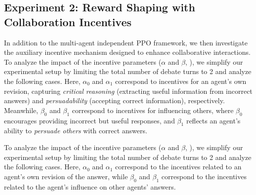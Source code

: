 \safevspace{-4mm}
\subsection{Experiment 2: Reward Shaping with Collaboration Incentives}
\label{sec:exp2}
In addition to the multi-agent independent PPO framework, we then investigate the auxiliary incentive mechanism designed to enhance collaborative interactions. 
To analyze the impact of the incentive parameters (\(\alpha\) and \(\beta\), ), we simplify our experimental setup by limiting the total number of debate turns to 2 and analyze the following cases. Here, \(\alpha_0\) and \(\alpha_1\) correspond to incentives for an agent’s own revision, capturing \textit{critical reasoning} (extracting useful information from incorrect answers) and \textit{persuadability} (accepting correct information), respectively. Meanwhile, \(\beta_0\) and \(\beta_1\) correspond to incentives for influencing others, where \(\beta_0\) encourages providing incorrect but useful responses, and \(\beta_1\) reflects an agent’s ability to \textit{persuade others} with correct answers.

To analyze the impact of the incentive parameters (\(\alpha\) and \(\beta\), ), we simplify our experimental setup by limiting the total number of debate turns to 2 and analyze the following cases. Here, \(\alpha_0\) and \(\alpha_1\) correspond to the incentives related to an agent's own revision of the answer, while \(\beta_0\) and \(\beta_1\) correspond to the incentives related to the agent's influence on other agents' answers.
\begin{table}[h]
    \centering
    \caption{Analysis of answer revision patterns under different $\alpha$ parameters. The columns RWR through WRR show the proportion of each transition type, where the three letters indicate Answer(t), Answer(t+1), and Majority(t) respectively. {R and W stand for right and wrong answer.} $\Delta_0$ measures the difference in transitions from wrong to right answers when the majority is wrong (WRW $-$ RWW) which is related to $\alpha_0$, while $\Delta_1$ measures transitions when the majority is right (WRR $-$ RWR) which is related to $\alpha_1$. }    \label{tab:alpha_analysis}
\end{table}
\safevspace{-3mm}


